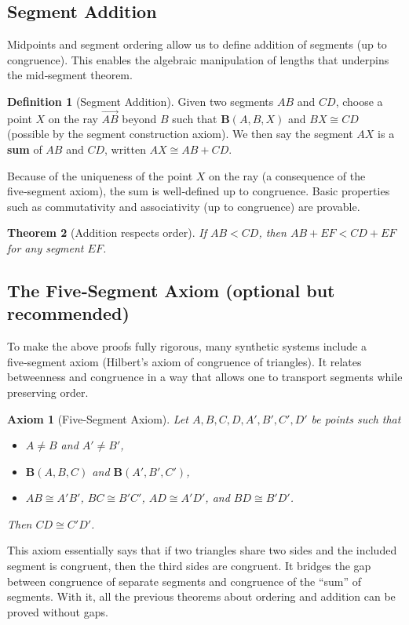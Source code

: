 \documentclass[12pt, letterpaper]{article}
\newtheorem{theorem}{Theorem}[section]
\newtheorem{axiom}{Axiom}
\theoremstyle{definition}
\newtheorem{definition}[theorem]{Definition}
\newcommand{\ray}[1]{\overrightarrow{#1}}
\begin{document}
\subsection{Segment Addition}
Midpoints and segment ordering allow us to define addition of segments (up to congruence). This enables the algebraic manipulation of lengths that underpins the mid‑segment theorem.

\begin{definition}[Segment Addition]
Given two segments $AB$ and $CD$, choose a point $X$ on the ray $\ray{AB}$ beyond $B$ such that $\mathbf{B}(A,B,X)$ and $BX \cong CD$ (possible by the segment construction axiom). We then say the segment $AX$ is a \textbf{sum} of $AB$ and $CD$, written $AX \cong AB + CD$.
\end{definition}

Because of the uniqueness of the point $X$ on the ray (a consequence of the five‑segment axiom), the sum is well‑defined up to congruence. Basic properties such as commutativity and associativity (up to congruence) are provable.

\begin{theorem}[Addition respects order]
If $AB < CD$, then $AB + EF < CD + EF$ for any segment $EF$.
\end{theorem}

\subsection{The Five‑Segment Axiom (optional but recommended)}
To make the above proofs fully rigorous, many synthetic systems include a five‑segment axiom (Hilbert’s axiom of congruence of triangles). It relates betweenness and congruence in a way that allows one to transport segments while preserving order.

\begin{axiom}[Five‑Segment Axiom]\label{ax:five-segment}
Let $A,B,C,D,A',B',C',D'$ be points such that
\begin{itemize}
  \item $A\neq B$ and $A'\neq B'$,
  \item $\mathbf{B}(A,B,C)$ and $\mathbf{B}(A',B',C')$,
  \item $AB \cong A'B'$, $BC \cong B'C'$, $AD \cong A'D'$, and $BD \cong B'D'$.
\end{itemize}
Then $CD \cong C'D'$.
\end{axiom}

This axiom essentially says that if two triangles share two sides and the included segment is congruent, then the third sides are congruent. It bridges the gap between congruence of separate segments and congruence of the “sum” of segments. With it, all the previous theorems about ordering and addition can be proved without gaps.
\end{document}
